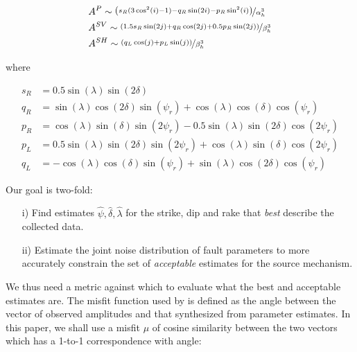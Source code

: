 \documentclass[preprint]{seismica}
\begin{document}
     \begin{align} \label{eq:eq1}
         \nonumber &A^P \sim \nicefrac{\left( s_R(3\cos^2(i) - 1) - q_R\sin(2i) - p_R\sin^2(i)\right)}{\alpha_h^3}\\
         &A^{SV} \sim \nicefrac{\left( 1.5 s_R\sin(2j) + q_R\cos(2j) + 0.5 p_R\sin(2j) \right)}{\beta_h^3}\\
         \nonumber &A^{SH} \sim \nicefrac{\left( q_L\cos(j) + p_L\sin(j) \right)}{\beta_h^3}
     \end{align}

     where

     \begin{align} \label{eq:eq2}
         \nonumber s_R &= 0.5 \sin(\lambda) \sin(2\delta)\\
         \nonumber q_R &= \sin(\lambda) \cos(2\delta) \sin(\psi_r) + \cos(\lambda) \cos(\delta) \cos(\psi_r)\\
         p_R &= \cos(\lambda) \sin(\delta) \sin(2\psi_r) - 0.5\sin(\lambda) \sin(2\delta) \cos(2\psi_r)\\
         \nonumber p_L &= 0.5\sin(\lambda) \sin(2\delta) \sin(2\psi_r) + \cos(\lambda) \sin(\delta) \cos(2\psi_r)\\
         \nonumber q_L &= -\cos(\lambda) \cos(\delta) \sin(\psi_r) + \sin(\lambda) \cos(2\delta) \cos(\psi_r)
     \end{align}

     Our goal is two-fold:
     \begin{enumerate}
         \item [i)]
            Find estimates $\widehat{\psi}, \widehat{\delta}, \widehat{\lambda}$ for the strike, dip
            and rake that \textit{best} describe the collected data.

        \item [ii)]
            Estimate the joint noise distribution of fault parameters to more accurately constrain the
            set of \textit{acceptable} estimates for the source mechanism.
            
     \end{enumerate}

     We thus need a metric against which to evaluate what the best and acceptable estimates are. The
     misfit function used by \citet{sita_potential_2022} is defined as the angle between the vector of
     observed amplitudes and that synthesized from parameter estimates. In this paper, we shall use a
     misfit $\mu$ of cosine similarity between the two vectors which has a 1-to-1 correspondence with
     angle:
\end{document}
